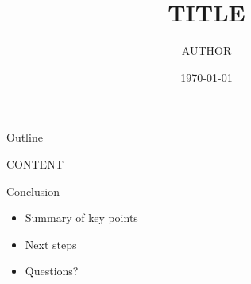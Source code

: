 \documentclass[14pt,aspectratio=169]{beamer}
\title{{{TITLE}}}
\author{{{AUTHOR}}}
\date{\today}
\institute{{{AFFILIATION}}}
\begin{document}
\begin{frame}
\titlepage
\end{frame}

\begin{frame}{Outline}
\tableofcontents
\end{frame}

{{CONTENT}}

\begin{frame}{Conclusion}
\begin{itemize}
    \item Summary of key points
    \item Next steps
    \item Questions?
\end{itemize}
\end{frame}
\end{document}
